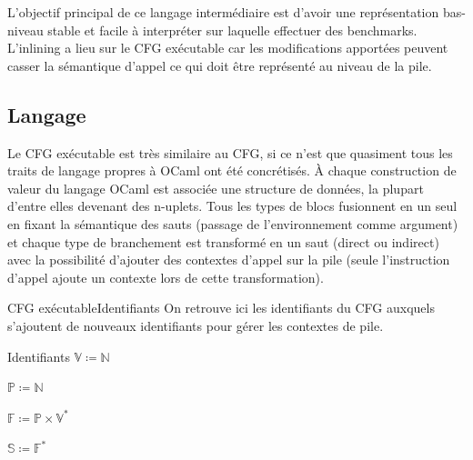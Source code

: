 \documentclass{beamer}
\begin{document}
L'objectif principal de ce langage intermédiaire est d'avoir une représentation bas-niveau stable et facile à interpréter sur laquelle effectuer des benchmarks. L'inlining a lieu sur le CFG exécutable car les modifications apportées peuvent casser la sémantique d'appel ce qui doit être représenté au niveau de la pile.

\subsection{Langage}

Le CFG exécutable est très similaire au CFG, si ce n'est que quasiment tous les traits de langage propres à OCaml ont été concrétisés. À chaque construction de valeur du langage OCaml est associée une structure de données, la plupart d'entre elles devenant des n-uplets. Tous les types de blocs fusionnent en un seul en fixant la sémantique des sauts (passage de l'environnement comme argument) et chaque type de branchement est transformé en un saut (direct ou indirect) avec la possibilité d'ajouter des contextes d'appel sur la pile (seule l'instruction d'appel ajoute un contexte lors de cette transformation).

\begin{frame}{CFG exécutable}{Identifiants}
    On retrouve ici les identifiants du CFG auxquels s'ajoutent de nouveaux identifiants pour gérer les contextes de pile.
    
    \begin{block}{Identifiants}
        $\mathbb{V} \coloneqq \mathbb{N}$%
        
        $\mathbb{P} \coloneqq \mathbb{N}$%
        
        $\mathbb{F} \coloneqq \mathbb{P} \times \mathbb{V}^{*}$%
        
        $\mathbb{S} \coloneqq \mathbb{F}^{*}$%
    \end{block}
\end{frame}
\end{document}
